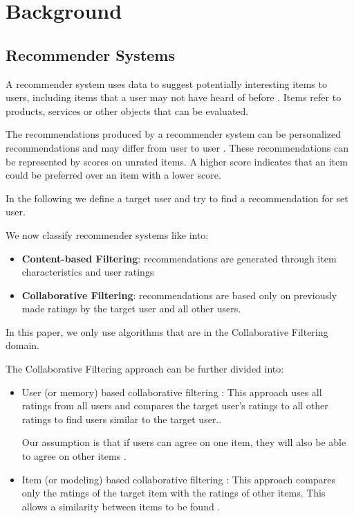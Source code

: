 \chapter{Background}

\label{chap:background}

\section{Recommender Systems}

\label{sec:background_recommend}

A recommender system uses data to suggest potentially interesting items to users, including items that a user may not have heard of before \cite{LU20121}. Items refer to products, services or other objects that can be evaluated. 

The recommendations produced by a recommender system can be personalized recommendations and may differ from user to user \cite{LU20121}. These recommendations can be represented by scores on unrated items. A higher score indicates that an item could be preferred over an item with a lower score.

In the following we define a target user and try to find a recommendation for set user.

We now classify recommender systems like \cite{LU20121, itemColFiltRecom} into:

\begin{itemize}
    \item \textbf{Content-based Filtering}: recommendations are generated through item characteristics and user ratings
    \item \textbf{Collaborative Filtering}: recommendations are based only on previously made ratings by the target user and all other users. 
\end{itemize}

In this paper, we only use algorithms that are in the Collaborative Filtering domain. 

The Collaborative Filtering approach can be further divided into:

\begin{itemize}
    \item User (or memory) based collaborative filtering \cite{itemColFiltRecom, LU20121}: This approach uses all ratings from all users and compares the target user's ratings to all other ratings to find users similar to the target user.\cite{itemColFiltRecom}. 

Our assumption is that if users can agree on one item, they will also be able to agree on other items \cite{LU20121}.
    \item Item (or modeling) based collaborative filtering \cite{itemColFiltRecom, LU20121}: This approach compares only the ratings of the target item with the ratings of other items. This allows a similarity between items to be found \cite{itemColFiltRecom}.
\end{itemize}

